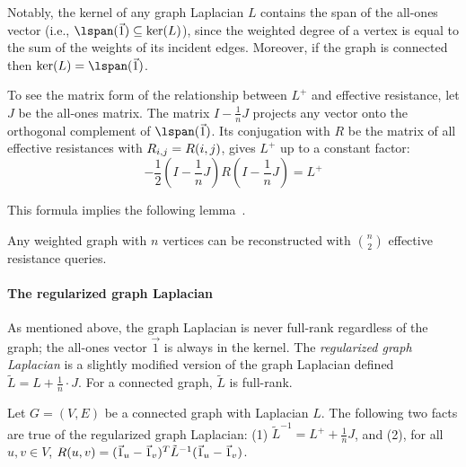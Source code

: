 Notably, the kernel of any graph Laplacian $L$ contains the span of the all-ones vector (i.e., $\lspan(\vec{1}) \subseteq \ker(L)$), since the weighted degree of a vertex is equal to the sum of the weights of its incident edges. Moreover, if the graph is connected then $\ker(L) = \lspan(\vec{1})$.

To see the matrix form of the relationship between $L^+$ and effective resistance, let $J$ be the all-ones matrix. The matrix $I - \frac{1}{n}J$ projects any vector onto the orthogonal complement of $\lspan(\vec{1})$.
Its conjugation with $R$ be the matrix of all effective resistances with $R_{i,j}=R(i,j)$, gives $L^+$ up to a constant factor:
\begin{equation}
    \label{eq:eff-res-matrix-form}
     -\frac{1}{2}\left(I-\frac{1}{n}J\right)R \left(I-\frac{1}{n}J\right)=L^+
\end{equation}

This formula implies the following lemma~\citep{journals/tcs/WittmannSBT09, Spielman2012TreesRecNotes, Hoskins2018Inferring}.
\begin{lemma}
\label{lem:full_reconstruciton}
    Any weighted graph with $n$ vertices can be reconstructed with $\binom{n}{2}$ effective resistance queries.
\end{lemma}


\paragraph{The regularized graph Laplacian}
As mentioned above, the graph Laplacian is never full-rank regardless of the graph; the all-ones vector $\vec{1}$ is always in the kernel. The \emph{regularized graph Laplacian} is a slightly modified version of the graph Laplacian defined $\widetilde{L} = L +  \frac{1}{n} \cdot J$. For a connected graph, $\widetilde{L}$ is full-rank. 

\begin{lemma}
    Let $G = (V, E)$ be a connected graph with Laplacian $L$. The following two facts are true of the regularized graph Laplacian: (1) $\tilde{L}^{-1} = L^{+} + \frac{1}{n} J$,
        and (2), for all $u, v \in V$, $R(u,v) = (\vec{1}_u - \vec{1}_v)^{T} \tilde{L}^{-1} (\vec{1}_u-\vec{1}_v)$.
\end{lemma}

